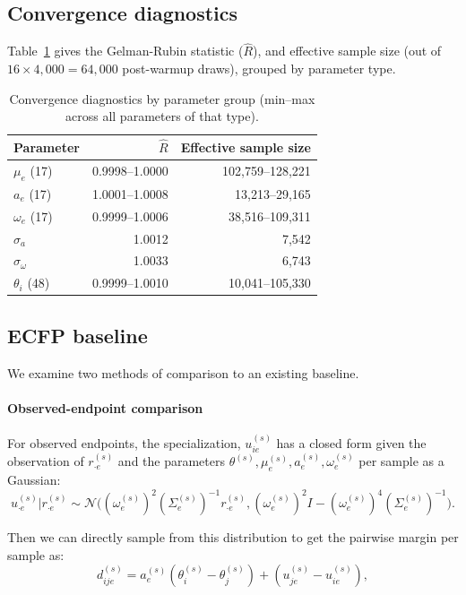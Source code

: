 \documentclass{article}
\begin{document}
\subsection{Convergence diagnostics}
\label{app:diagnostics}
Table~\ref{tab:diagnostics} gives the Gelman-Rubin statistic ($\hat{R}$), and effective sample size (out of $16 \times 4{,}000 = 64{,}000$ post-warmup draws), grouped by parameter type.

\begin{table}[H]
\centering
\caption{Convergence diagnostics by parameter group (min--max across all parameters of that type).}
\label{tab:diagnostics}
\begin{tabular}{lrr}
\toprule
Parameter & $\hat{R}$ & Effective sample size \\
\midrule
$\mu_e$ (17) & 0.9998--1.0000 & 102{,}759--128{,}221 \\
$a_e$ (17) & 1.0001--1.0008 & 13{,}213--29{,}165 \\
$\omega_e$ (17) & 0.9999--1.0006 & 38{,}516--109{,}311 \\
$\sigma_a$ & 1.0012 & 7{,}542 \\
$\sigma_\omega$ & 1.0033 & 6{,}743 \\
$\theta_i$ (48) & 0.9999--1.0010 & 10{,}041--105{,}330 \\
\bottomrule
\end{tabular}
\end{table}


\subsection{ECFP baseline}
\label{sec:ecfp_baseline}
We examine two methods of comparison to an existing baseline. 
\paragraph{Observed-endpoint comparison}
For observed endpoints, the specialization, $u_{ie}^{(s)}$ has a closed form given the observation of $r_{\cdot e}^{(s)}$ and the parameters $\theta^{(s)}, \mu_e^{(s)}, a_e^{(s)}, \omega_e^{(s)}$ per sample as a Gaussian:
\begin{equation}
    u_{\cdot e}^{(s)} | r_{\cdot e}^{(s)} \sim \mathcal{N}\bigl( (\omega_e^{(s)})^2 (\Sigma_e^{(s)})^{-1} r_{\cdot e}^{(s)}, (\omega_e^{(s)})^2I - (\omega_e^{(s)})^4(\Sigma_e^{(s)})^{-1}
    \bigr).
\end{equation}

Then we can directly sample from this distribution to get the pairwise margin per sample as:
\begin{equation}
    d_{ije}^{(s)} = a_e^{(s)}(\theta_i^{(s)} - \theta_j^{(s)}) + (u_{je}^{(s)} - u_{ie}^{(s)}),
\end{equation}
\end{document}
